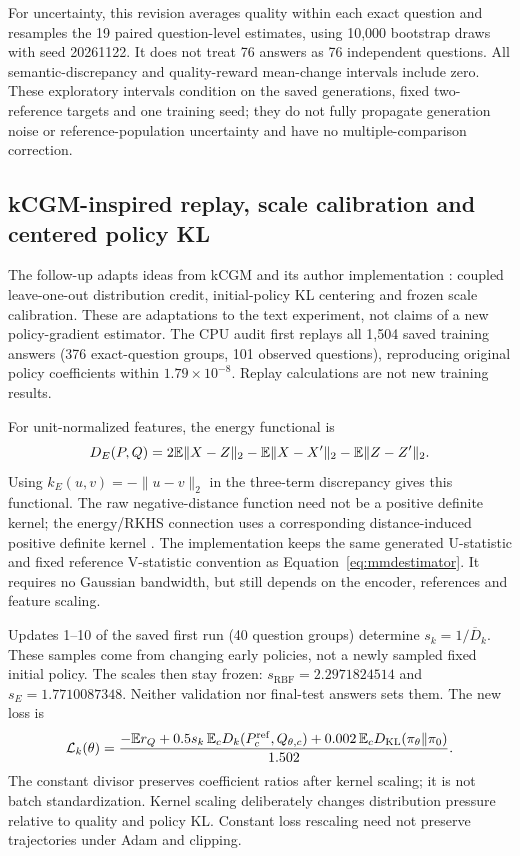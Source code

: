 For uncertainty, this revision averages quality within each exact
question and resamples the 19 paired question-level estimates, using
10,000 bootstrap draws with seed 20261122. It does not treat 76 answers
as 76 independent questions. All semantic-discrepancy and quality-reward
mean-change intervals include zero. These exploratory intervals condition
on the saved generations, fixed two-reference targets and one training
seed; they do not fully propagate generation noise or reference-population
uncertainty and have no multiple-comparison correction.

\subsection{kCGM-inspired replay, scale calibration and centered policy KL}
The follow-up adapts ideas from kCGM \cite{diamant2026kcgm} and its
author implementation \cite{kcgmcode}: coupled leave-one-out
distribution credit, initial-policy KL centering and frozen scale
calibration. These are adaptations to the text experiment, not claims
of a new policy-gradient estimator. The CPU audit first replays all
1,504 saved training answers (376 exact-question groups, 101 observed
questions), reproducing original policy coefficients within
$1.79\times10^{-8}$. Replay calculations are not new training results.

For unit-normalized features, the energy functional is
\begin{equation}
 D_E(P,Q)=2\mathbb{E}\|X-Z\|_2-\mathbb{E}\|X-X'\|_2-\mathbb{E}\|Z-Z'\|_2.
 \label{eq:energy}
\end{equation}
Using $k_E(u,v)=-\|u-v\|_2$ in the three-term discrepancy gives this
functional. The raw negative-distance function need not be a positive
definite kernel; the energy/RKHS connection uses a corresponding
distance-induced positive definite kernel \cite{sejdinovic2013}.
The implementation keeps the same generated U-statistic and fixed
reference V-statistic convention as Equation~\eqref{eq:mmdestimator}.
It requires no Gaussian bandwidth, but still depends on the encoder,
references and feature scaling.

Updates 1--10 of the saved first run (40 question groups) determine
$s_k=1/\overline D_k$. These samples come from changing early policies,
not a newly sampled fixed initial policy. The scales then stay frozen:
$s_{\mathrm{RBF}}=2.2971824514$ and $s_E=1.7710087348$.
Neither validation nor final-test answers sets them. The new loss is
\begin{equation}
 \mathcal L_k(\theta)=\frac{
 -\mathbb{E} r_Q+0.5s_k\,\mathbb{E}_c D_k(P_c^{\mathrm{ref}},Q_{\theta,c})
 +0.002\,\mathbb{E}_cD_{\mathrm{KL}}(\pi_\theta\Vert\pi_0)}{1.502}.
 \label{eq:calibratedloss}
\end{equation}
The constant divisor preserves coefficient ratios after kernel scaling;
it is not batch standardization. Kernel scaling deliberately changes
distribution pressure relative to quality and policy KL. Constant loss
rescaling need not preserve trajectories under Adam and clipping.

